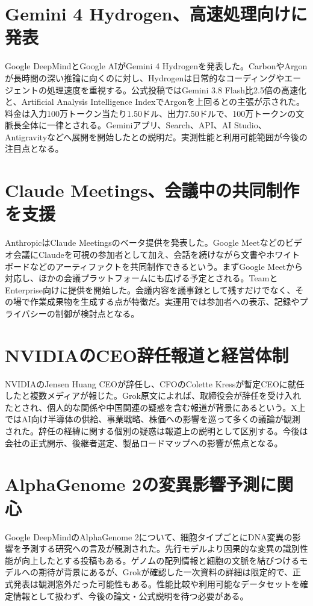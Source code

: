 \section{Gemini 4 Hydrogen、高速処理向けに発表}
Google DeepMindとGoogle AIがGemini 4 Hydrogenを発表した。CarbonやArgonが長時間の深い推論に向くのに対し、Hydrogenは日常的なコーディングやエージェントの処理速度を重視する。公式投稿ではGemini 3.8 Flash比2.5倍の高速化と、Artificial Analysis Intelligence IndexでArgonを上回るとの主張が示された。料金は入力100万トークン当たり1.50ドル、出力7.50ドルで、100万トークンの文脈長全体に一律とされる。Geminiアプリ、Search、API、AI Studio、Antigravityなどへ展開を開始したとの説明だ。実測性能と利用可能範囲が今後の注目点となる。

\section{Claude Meetings、会議中の共同制作を支援}
AnthropicはClaude Meetingsのベータ提供を発表した。Google Meetなどのビデオ会議にClaudeを可視の参加者として加え、会話を続けながら文書やホワイトボードなどのアーティファクトを共同制作できるという。まずGoogle Meetから対応し、ほかの会議プラットフォームにも広げる予定とされる。TeamとEnterprise向けに提供を開始した。会議内容を議事録として残すだけでなく、その場で作業成果物を生成する点が特徴だ。実運用では参加者への表示、記録やプライバシーの制御が検討点となる。

\section{NVIDIAのCEO辞任報道と経営体制}
NVIDIAのJensen Huang CEOが辞任し、CFOのColette Kressが暫定CEOに就任したと複数メディアが報じた。Grok原文によれば、取締役会が辞任を受け入れたとされ、個人的な関係や中国関連の疑惑を含む報道が背景にあるという。X上ではAI向け半導体の供給、事業戦略、株価への影響を巡って多くの議論が観測された。辞任の経緯に関する個別の疑惑は報道上の説明として区別する。今後は会社の正式開示、後継者選定、製品ロードマップへの影響が焦点となる。

\section{AlphaGenome 2の変異影響予測に関心}
Google DeepMindのAlphaGenome 2について、細胞タイプごとにDNA変異の影響を予測する研究への言及が観測された。先行モデルより因果的な変異の識別性能が向上したとする投稿もある。ゲノムの配列情報と細胞の文脈を結びつけるモデルへの期待が背景にあるが、Grokが確認した一次資料の詳細は限定的で、正式発表は観測窓外だった可能性もある。性能比較や利用可能なデータセットを確定情報として扱わず、今後の論文・公式説明を待つ必要がある。

